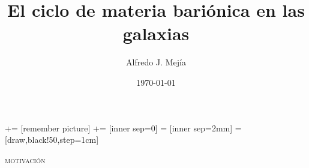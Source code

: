 \documentclass[xcolor=dvipsnames,4pt,hyperref={colorlinks,citecolor=black,linkcolor=black,urlcolor=black}]{beamer}
\begin{document}
+= [remember picture]
 += [inner sep=0]
 = [inner sep=2mm]
=[draw,black!50,step=1cm]

\begin{frame}
\title{El ciclo de materia bariónica en las galaxias}
\author{Alfredo J. Mej\'ia}
\date{\today}

\maketitle
\end{frame}

\begin{frame}{\textsc{motivación}}


\end{frame}
\end{document}
